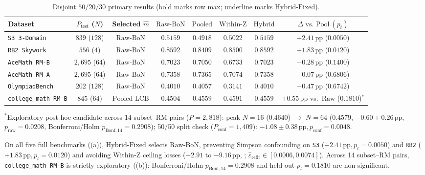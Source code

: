 \documentclass{article}
\theoremstyle{plain}
\theoremstyle{definition}
\theoremstyle{remark}
\begin{document}
\begin{table}[htbp]
\centering
\caption{Disjoint $50/20/30$ primary results (bold marks row max; underline marks $\mathrm{Hybrid\text{-}Fixed}$).}
\label{tab:single-split}
\scriptsize
\setlength{\tabcolsep}{2.8pt}
\begin{tabular}{lccccccc}
\toprule
Dataset & $P_{\mathrm{test}}$ ($N$) & Selected $\hat{m}$ & $\mathrm{Raw\text{-}BoN}$ & $\mathrm{Pooled}$ & $\mathrm{Within\text{-}Z}$ & $\mathrm{Hybrid}$ & $\Delta\text{ vs.\ Pool}\ (p_t)$ \\
\midrule
\texttt{S3 3-Domain}     & $839$ ($128$)   & $\mathrm{Raw\text{-}BoN}$ & $\mathbf{0.5159}$ & $0.4918$ & $0.5022$ & $\mathbf{0.5159}$ & $+2.41\,\mathrm{pp}$ ($0.0050$) \\
\texttt{RB2 Skywork}     & $556$ ($4$)     & $\mathrm{Raw\text{-}BoN}$ & $\mathbf{0.8592}$ & $0.8409$ & $0.8500$ & $\mathbf{0.8592}$ & $+1.83\,\mathrm{pp}$ ($0.0120$) \\
\texttt{AceMath RM-B}    & $2{,}695$ ($64$)& $\mathrm{Raw\text{-}BoN}$ & $0.7023$ & $\mathbf{0.7050}$ & $0.6733$ & $0.7023$          & $-0.28\,\mathrm{pp}$ ($0.1400$) \\
\texttt{AceMath RM-A}    & $2{,}695$ ($64$)& $\mathrm{Raw\text{-}BoN}$ & $0.7358$ & $\mathbf{0.7365}$ & $0.7074$ & $0.7358$          & $-0.07\,\mathrm{pp}$ ($0.6806$) \\
\texttt{OlympiadBench}   & $202$ ($128$)   & $\mathrm{Raw\text{-}BoN}$ & $0.4010$ & $\mathbf{0.4057}$ & $0.3141$ & $0.4010$          & $-0.47\,\mathrm{pp}$ ($0.6742$) \\
\midrule
\texttt{college\_math RM-B} & $845$ ($64$) & $\mathrm{Pooled\text{-}LCB}$ & $0.4504$ & $0.4559$ & $\mathbf{0.4591}$ & \underline{$0.4559$} & $+0.55\,\mathrm{pp}$ vs.\ $\mathrm{Raw}$ ($0.1810$)$^*$ \\
\bottomrule
\end{tabular}
\vspace{2pt}
{\footnotesize $^*$Exploratory post-hoc candidate across 14 subset--RM pairs ($P=2{,}818$): peak $N=16$ ($0.4640$) $\to$ $N=64$ ($0.4579$, $-0.60 \pm 0.26\,\mathrm{pp}$, $p_{\mathrm{raw}} = 0.0208$, Bonferroni/Holm $p_{\mathrm{Bonf},14} = 0.2908$); 50/50 split check ($P_{\mathrm{conf}}=1{,}409$): $-1.08 \pm 0.38\,\mathrm{pp}, p_{\mathrm{conf}}=0.0048$.}
\end{table}

On all five full benchmarks ((a)), $\mathrm{Hybrid\text{-}Fixed}$ selects $\mathrm{Raw\text{-}BoN}$, preventing Simpson confounding on \texttt{S3} ($+2.41\,\mathrm{pp}, p_t=0.0050$) and \texttt{RB2} ($+1.83\,\mathrm{pp}, p_t=0.0120$) and avoiding $\mathrm{Within\text{-}Z}$ ceiling losses ($-2.91$ to $-9.16\,\mathrm{pp}$, ; $\hat{\varepsilon}_{\mathrm{refit}} \in [0.0006, 0.0074]$). Across 14 subset--RM pairs, \texttt{college\_math RM-B} is strictly exploratory ((b)): Bonferroni/Holm $p_{\mathrm{Bonf},14} = 0.2908$ and held-out $p_t = 0.1810$ are non-significant.
\end{document}
